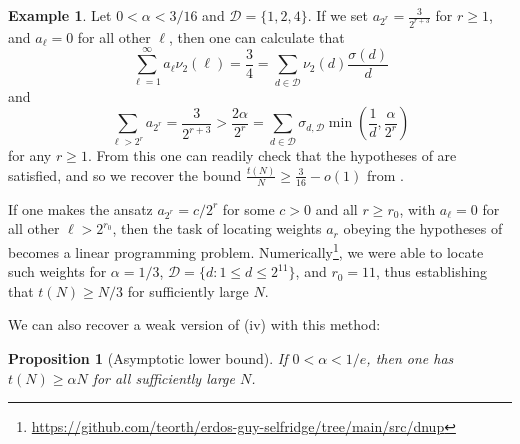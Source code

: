 \documentclass[12pt,a4paper,reqno]{amsart}
\numberwithin{equation}{section}
\theoremstyle{plain}
\newtheorem{proposition}[theorem]{Proposition}
\theoremstyle{definition}
\newtheorem{example}[theorem]{Example}
\begin{document}
\begin{example}  Let $0 < \alpha < 3/16$ and ${\mathcal D} = \{1,2,4\}$.  If we set $a_{2^r} = \frac{3}{2^{r+3}}$ for $r \geq 1$, and $a_\ell=0$ for all other $\ell$, then one can calculate that
$$ \sum_{\ell=1}^\infty a_\ell \nu_2(\ell) = \frac{3}{4} = \sum_{d \in {\mathcal D}} \nu_2(d) \frac{\sigma(d)}{d}$$
and
$$ \sum_{\ell > 2^r} a_{2^r} = \frac{3}{2^{r+3}} > \frac{2\alpha}{2^r} = \sum_{d \in {\mathcal D}} \sigma_{d,{\mathcal D}} \min\left( \frac{1}{d}, \frac{\alpha}{2^r} \right)$$
for any $r \geq 1$.  From this one can readily check that the hypotheses of  are satisfied, and so we recover the bound $\frac{t(N)}{N} \geq \frac{3}{16}-o(1)$ from \cite{guy}.
\end{example}

If one makes the ansatz $a_{2^r} = c / 2^r$ for some $c>0$ and all $r \geq r_0$, with $a_\ell = 0$ for all other $\ell > 2^{r_0}$, then the task of locating weights $a_r$ obeying the hypotheses of  becomes a linear programming problem.  
Numerically\footnote{\url{https://github.com/teorth/erdos-guy-selfridge/tree/main/src/dnup}}, we were able to locate such weights for $\alpha=1/3$, ${\mathcal D} = \{d: 1 \leq d \leq 2^{11}\}$, and $r_0=11$, thus establishing that $t(N) \geq N/3$ for sufficiently large $N$.

We can also recover a weak version of (iv) with this method:

\begin{proposition}[Asymptotic lower bound]\label{asymp}  If $0 < \alpha < 1/e$, then one has $t(N) \geq \alpha N$ for all sufficiently large $N$.
\end{proposition}
\end{document}
